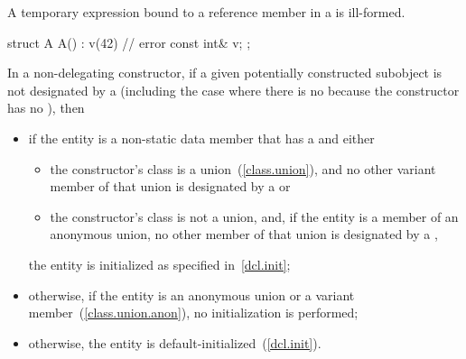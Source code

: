 \pnum
A temporary expression bound to a reference member in a 
is ill-formed.
\enterexample
\begin{codeblock}
struct A {
  A() : v(42) { }  // error
  const int& v;
};
\end{codeblock}
\exitexample

\pnum
In a non-delegating constructor, if
a given potentially constructed subobject is not designated by a
(including the case where there is no
because the constructor has no
),
then

\begin{itemize}
\item if the entity is a non-static data member that has a  and either

\begin{itemize}
\item the constructor's class is a union~(\ref{class.union}), and no other variant
member of that union is designated by a  or

\item the constructor's class is not a union, and, if the entity is a member of an
anonymous union, no other member of that union is designated by a
,
\end{itemize}

the entity is initialized as specified in~\ref{dcl.init};

\item otherwise, if the entity is an anonymous union or a variant member~(\ref{class.union.anon}), no initialization is performed;

\item otherwise, the entity is default-initialized~(\ref{dcl.init}).
\end{itemize}

